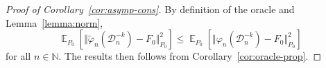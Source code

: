 \documentclass[a4paper,danish]{article}
\theoremstyle{plain} %
\numberwithin{theorem}{section}
\theoremstyle{definition} %
\theoremstyle{remark}
\DeclareMathOperator{\E}{\mathbb{E}} %
\newcommand{\N}{\mathbb{N}}
\renewcommand{\phi}{\varphi}
\newcommand{\1}{\mathds{1}}
\newcommand{\data}{\ensuremath{\mathcal{D}}}
\begin{document}
\begin{proof}[Proof of Corollary~\ref{cor:asymp-cons}]
  By definition of the oracle and Lemma~\ref{lemma:norm},
  \begin{equation*}
    \E_{P_0}{\left[ \Vert \tilde{\phi}_n(\data_n^{-k}) - F_0 \Vert_{P_0}^2
      \right]} \leq \E_{P_0}{\left[ \Vert \phi_n(\data_n^{-k}) - F_0 \Vert_{P_0}^2
      \right]}  
  \end{equation*}
  for all \( n \in \N \). The results then follows from
  Corollary~\ref{cor:oracle-prop}.
\end{proof}
\end{document}
